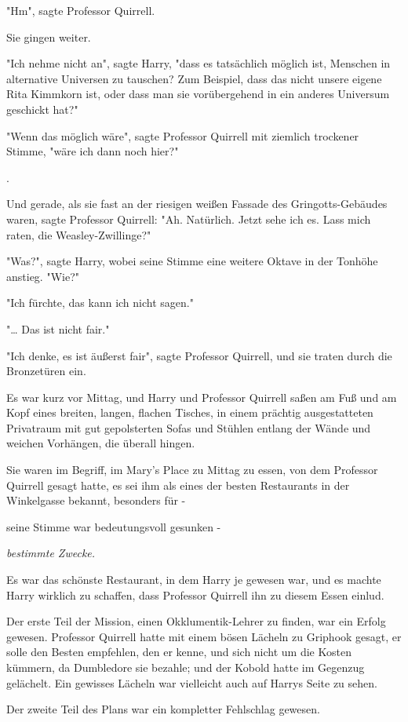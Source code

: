 {"Hm", sagte Professor Quirrell.

Sie gingen weiter.

"Ich nehme nicht an", sagte Harry, "dass es tatsächlich möglich ist, Menschen in alternative Universen zu tauschen? Zum Beispiel, dass das nicht unsere eigene Rita Kimmkorn ist, oder dass man sie vorübergehend in ein anderes Universum geschickt hat?"

"Wenn das möglich wäre", sagte Professor Quirrell mit ziemlich trockener Stimme, "wäre ich dann noch hier?"

.

Und gerade, als sie fast an der riesigen weißen Fassade des Gringotts-Gebäudes waren, sagte Professor Quirrell: "Ah. Natürlich. Jetzt sehe ich es. Lass mich raten, die Weasley-Zwillinge?"

"Was?", sagte Harry, wobei seine Stimme eine weitere Oktave in der Tonhöhe anstieg. "Wie?"

"Ich fürchte, das kann ich nicht sagen."

"… Das ist nicht fair."

"Ich denke, es ist äußerst fair", sagte Professor Quirrell, und sie traten durch die Bronzetüren ein.

Es war kurz vor Mittag, und Harry und Professor Quirrell saßen am Fuß und am Kopf eines breiten, langen, flachen Tisches, in einem prächtig ausgestatteten Privatraum mit gut gepolsterten Sofas und Stühlen entlang der Wände und weichen Vorhängen, die überall hingen.

Sie waren im Begriff, im Mary's Place zu Mittag zu essen, von dem Professor Quirrell gesagt hatte, es sei ihm als eines der besten Restaurants in der Winkelgasse bekannt, besonders für -

seine Stimme war bedeutungsvoll gesunken -

\emph{bestimmte Zwecke.}

Es war das schönste Restaurant, in dem Harry je gewesen war, und es machte Harry wirklich zu schaffen, dass Professor Quirrell ihn zu diesem Essen einlud.

Der erste Teil der Mission, einen Okklumentik-Lehrer zu finden, war ein Erfolg gewesen. Professor Quirrell hatte mit einem bösen Lächeln zu Griphook gesagt, er solle den Besten empfehlen, den er kenne, und sich nicht um die Kosten kümmern, da Dumbledore sie bezahle; und der Kobold hatte im Gegenzug gelächelt. Ein gewisses Lächeln war vielleicht auch auf Harrys Seite zu sehen.

Der zweite Teil des Plans war ein kompletter Fehlschlag gewesen.

}
